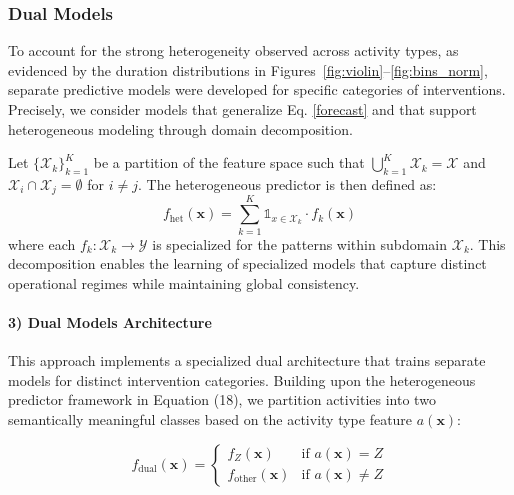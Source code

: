 \documentclass[preprint,12pt]{elsarticle}
\begin{document}
\subsubsection{Dual Models}



To account for the strong heterogeneity observed across activity types, as evidenced by the duration distributions in Figures~\ref{fig:violin}--\ref{fig:bins_norm}, separate predictive models were developed for specific categories of interventions. Precisely, we consider models that generalize Eq. \eqref{forecast} and that support heterogeneous modeling through domain decomposition.


Let $\{\mathcal{X}_k\}_{k=1}^K$ be a partition of the feature space such that $\bigcup_{k=1}^K \mathcal{X}_k = \mathcal{X}$ and $\mathcal{X}_i \cap \mathcal{X}_j = \emptyset$ for $i \neq j$. The heterogeneous predictor is then defined as:
\begin{equation}
f_{\text{het}}(\mathbf{x}) = \sum_{k=1}^K \mathds{1}_{x \in \mathcal{X}_k} \cdot f_k(\mathbf{x})
\end{equation}
where each $f_k: \mathcal{X}_k \to \mathcal{Y}$ is specialized for the patterns within subdomain $\mathcal{X}_k$. This decomposition enables the learning of specialized models that capture distinct operational regimes while maintaining global consistency. 







\paragraph{3) Dual Models Architecture}

This approach implements a specialized dual architecture that trains separate models for distinct intervention categories. Building upon the heterogeneous predictor framework in Equation (18), we partition activities into two semantically meaningful classes based on the activity type feature $a(\mathbf{x})$:

\begin{equation}
f_{\text{dual}}(\mathbf{x}) = \begin{cases}
f_Z(\mathbf{x}) & \text{if } a(\mathbf{x}) = Z \\
f_{\text{other}}(\mathbf{x}) & \text{if } a(\mathbf{x}) \neq Z
\end{cases}
\end{equation}
\end{document}
